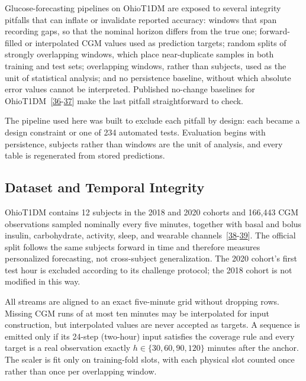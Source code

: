 \documentclass[journal]{IEEEtran}
\begin{document}
Glucose-forecasting pipelines on OhioT1DM are exposed to several integrity pitfalls that can inflate or invalidate reported accuracy: windows that span recording gaps, so that the nominal horizon differs from the true one; forward-filled or interpolated CGM values used as prediction targets; random splits of strongly overlapping windows, which place near-duplicate samples in both training and test sets; overlapping windows, rather than subjects, used as the unit of statistical analysis; and no persistence baseline, without which absolute error values cannot be interpreted. Published no-change baselines for OhioT1DM~[\hyperref[ref56label]{36}-\hyperref[ref57label]{37}] make the last pitfall straightforward to check.

The pipeline used here was built to exclude each pitfall by design: each became a design constraint or one of 234 automated tests. Evaluation begins with persistence, subjects rather than windows are the unit of analysis, and every table is regenerated from stored predictions.

\subsection{Dataset and Temporal Integrity}

OhioT1DM contains 12 subjects in the 2018 and 2020 cohorts and 166,443 CGM observations sampled nominally every five minutes, together with basal and bolus insulin, carbohydrate, activity, sleep, and wearable channels~[\hyperref[ref30label]{38}-\hyperref[ref31label]{39}]. The official split follows the same subjects forward in time and therefore measures personalized forecasting, not cross-subject generalization. The 2020 cohort's first test hour is excluded according to its challenge protocol; the 2018 cohort is not modified in this way.

All streams are aligned to an exact five-minute grid without dropping rows. Missing CGM runs of at most ten minutes may be interpolated for input construction, but interpolated values are never accepted as targets. A sequence is emitted only if its 24-step (two-hour) input satisfies the coverage rule and every target is a real observation exactly $h \in \{30, 60, 90, 120\}$ minutes after the anchor. The scaler is fit only on training-fold slots, with each physical slot counted once rather than once per overlapping window.
\end{document}
